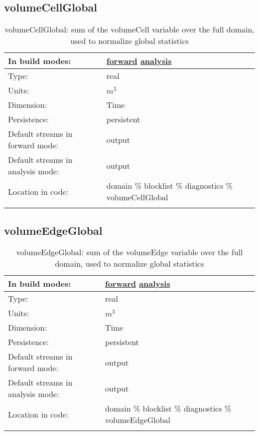\subsection[volumeCellGlobal]{volumeCellGlobal}
\label{subsec:var_sec_diagnostics_volumeCellGlobal}
\begin{center}
\begin{longtable}{| p{2.0in} | p{4.0in} |}
        \hline 
        In build modes: & \hyperref[subsec:forward_var_tab_diagnostics]{forward} \hyperref[subsec:analysis_var_tab_diagnostics]{analysis} \\
        \hline 
        Type: & real \\
        \hline 
        Units: & $m^3$ \\
        \hline 
        Dimension: & Time \\
        \hline 
        Persistence: & persistent \\
        \hline 
		 Default streams in forward mode: &  output \\
        \hline 
		 Default streams in analysis mode: &  output \\
        \hline 
		 Location in code: & domain \% blocklist \% diagnostics \% volumeCellGlobal \\
		 \hline 
    \caption{volumeCellGlobal: sum of the volumeCell variable over the full domain, used to normalize global statistics}
\end{longtable}
\end{center}
\subsection[volumeEdgeGlobal]{volumeEdgeGlobal}
\label{subsec:var_sec_diagnostics_volumeEdgeGlobal}
\begin{center}
\begin{longtable}{| p{2.0in} | p{4.0in} |}
        \hline 
        In build modes: & \hyperref[subsec:forward_var_tab_diagnostics]{forward} \hyperref[subsec:analysis_var_tab_diagnostics]{analysis} \\
        \hline 
        Type: & real \\
        \hline 
        Units: & $m^3$ \\
        \hline 
        Dimension: & Time \\
        \hline 
        Persistence: & persistent \\
        \hline 
		 Default streams in forward mode: &  output \\
        \hline 
		 Default streams in analysis mode: &  output \\
        \hline 
		 Location in code: & domain \% blocklist \% diagnostics \% volumeEdgeGlobal \\
		 \hline 
    \caption{volumeEdgeGlobal: sum of the volumeEdge variable over the full domain, used to normalize global statistics}
\end{longtable}
\end{center}
